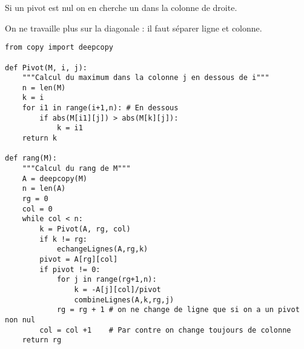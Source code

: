 \begin{Answer}
Si un pivot est nul on en cherche un dans la colonne de droite.

On ne travaille plus sur la diagonale : il faut séparer ligne et colonne.

\begin{lstlisting}
from copy import deepcopy

def Pivot(M, i, j):
    """Calcul du maximum dans la colonne j en dessous de i"""
    n = len(M)
    k = i 
    for i1 in range(i+1,n): # En dessous
        if abs(M[i1][j]) > abs(M[k][j]):
            k = i1 
    return k

def rang(M):
    """Calcul du rang de M"""
    A = deepcopy(M)
    n = len(A)
    rg = 0
    col = 0
    while col < n:
        k = Pivot(A, rg, col)
        if k != rg: 
            echangeLignes(A,rg,k)
        pivot = A[rg][col]
        if pivot != 0:
            for j in range(rg+1,n):
                k = -A[j][col]/pivot
                combineLignes(A,k,rg,j)
            rg = rg + 1 # on ne change de ligne que si on a un pivot non nul
        col = col +1    # Par contre on change toujours de colonne   
    return rg
\end{lstlisting}
\end{Answer}
